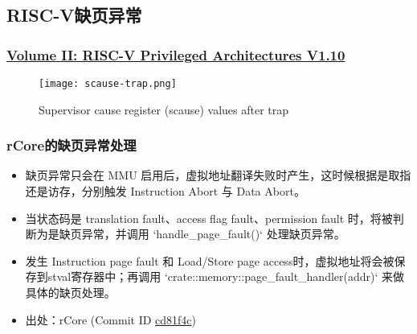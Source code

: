 \subsection{RISC-V缺页异常}
\begin{frame}   
	\frametitle{\href{https://content.riscv.org/wp-content/uploads/2017/05/riscv-privileged-v1.10.pdf}{Volume II: RISC-V Privileged Architectures V1.10}}
	\begin{figure}
	\texttt{[image: scause-trap.png]}
	\caption{Supervisor cause register (scause) values after trap}
	\end{figure}
\end{frame}
% 
% 
% 
\begin{frame}   
	\frametitle{rCore的缺页异常处理}
    \begin{itemize}
        \item 缺页异常只会在 MMU 启用后，虚拟地址翻译失败时产生，这时候根据是取指还是访存，分别触发 Instruction Abort 与 Data Abort。 \pause
        \item 当状态码是 translation fault、access flag fault、permission fault 时，将被判断为是缺页异常，并调用 `handle\_page\_fault()` 处理缺页异常。 \pause
        \item 发生 Instruction page fault 和 Load/Store page access时，虚拟地址将会被保存到stval寄存器中；再调用 `crate::memory::page\_fault\_handler(addr)` 来做具体的缺页处理。\pause
        \item 出处：rCore (Commit ID \href{https://github.com/rcore-os/rCore/tree/cd81f4cc73ea3302ed0356398525b0b56c4fca92}{cd81f4c})
    \end{itemize}
\end{frame}
% 
% 
% 
% 
